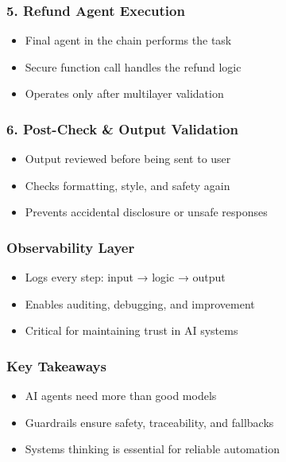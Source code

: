 \begin{frame}[fragile]\frametitle{5. Refund Agent Execution}
    \begin{itemize}
        \item Final agent in the chain performs the task
        \item Secure function call handles the refund logic
        \item Operates only after multilayer validation
    \end{itemize}
\end{frame}

\begin{frame}[fragile]\frametitle{6. Post-Check \& Output Validation}
    \begin{itemize}
        \item Output reviewed before being sent to user
        \item Checks formatting, style, and safety again
        \item Prevents accidental disclosure or unsafe responses
    \end{itemize}
\end{frame}

\begin{frame}[fragile]\frametitle{Observability Layer}
    \begin{itemize}
        \item Logs every step: input → logic → output
        \item Enables auditing, debugging, and improvement
        \item Critical for maintaining trust in AI systems
    \end{itemize}
\end{frame}

\begin{frame}[fragile]\frametitle{Key Takeaways}
    \begin{itemize}
        \item AI agents need more than good models
        \item Guardrails ensure safety, traceability, and fallbacks
        \item Systems thinking is essential for reliable automation
    \end{itemize}
\end{frame}


